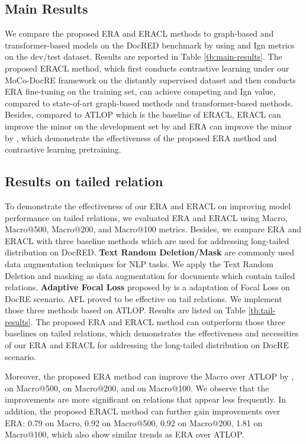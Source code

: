 \documentclass[11pt]{article}
\begin{document}
\subsection{Main Results}
We compare the proposed ERA and ERACL methods to graph-based and transformer-based models on the DocRED benchmark by using  and Ign  metrics on the dev/test dataset. Results are reported in Table \ref{tb:main-results}. The proposed ERACL method, which first conducts contrastive learning under our MoCo-DocRE framework on the distantly supervised dataset and then conducts ERA fine-tuning on the training set, can achieve competing  and Ign  value, compared to state-of-art graph-based methods and transformer-based methods. Besides, compared to ATLOP\citep{zhou_atlop_2021} which is the baseline of ERACL, ERACL can improve the minor  on the development set by  and ERA can improve the minor  by , which demonstrate the effectiveness of the proposed ERA method and contrastive learning pretraining.



\subsection{Results on tailed relation}
    To demonstrate the effectiveness of our ERA and ERACL on improving model performance on tailed relations, we evaluated ERA and ERACL using Macro, Macro@500, Macro@200, and Macro@100 metrics. Besides, we compare ERA and ERACL with three baseline methods which are used for addressing long-tailed distribution on DocRED. 
    \textbf{Text Random Deletion/Mask} are commonly used data augmentation techniques for NLP tasks. We apply the Text Random Deletion and masking as data augmentation for documents which contain  tailed relations. 
    \textbf{Adaptive Focal Loss} proposed by \citet{tan-etal-2022-document} is a adaptation of Focal Loss\citep{Lin_2017_ICCV} on DocRE scenario. AFL proved to be effective on tail relations. We implement those three methods based on ATLOP. Results are listed on Table \ref{tb:tail-results}. The proposed ERA and ERACL method can outperform those three baselines on tailed relations, which demonstrates the effectiveness and necessities of our ERA and ERACL for addressing the long-tailed distribution on DocRE scenario.
    
    Moreover, the proposed ERA method can improve the Macro over ATLOP by ,  on Macro@500,  on Macro@200, and  on Macro@100. We observe that the improvements are more significant on relations that appear less frequently. In addition, the proposed ERACL method can further gain improvements over ERA: 0.79 on Macro, 0.92 on Macro@500, 0.92 on Macro@200, 1.81 on Macro@100, which also show similar trends as ERA over ATLOP.
    
\end{document}
